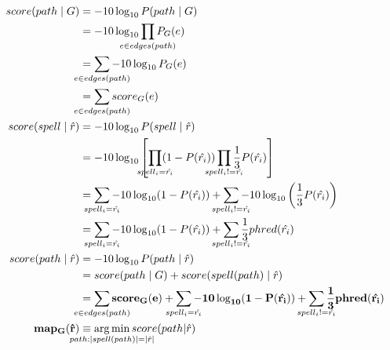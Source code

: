 \begin{align*}
    score(path \mid G) &= - 10 \log_{10} P(path \mid G) \\
		&= - 10 \log_{10} \smashoperator{\prod_{e \in edges(path)}} P_G(e) \\
		&= \smashoperator{\sum_{e \in edges(path)}} - 10 \log_{10} P_G(e) \\
		&= \smashoperator{\sum_{e \in edges(path)}} score_G(e) \\
	score(spell \mid \hat{r}) &= - 10 \log_{10} P(spell \mid \hat{r}) \\
		&= - 10 \log_{10} \left[ \smashoperator{\prod_{spell_i = \hat{r_i}}} (1-P(\hat{r_i})) \smashoperator{\prod_{\substack{spell_i != \hat{r_i}}}} \frac{1}{3} P(\hat{r_i}) \right] \\
		&= \smashoperator{\sum_{spell_i=\hat{r_i}}} - 10 \log_{10} (1-P(\hat{r_i})) + \smashoperator{\sum_{\substack{spell_i!=\hat{r_i}}}} - 10 \log_{10} \left( \frac{1}{3} P(\hat{r_i}) \right) \\
		&= \smashoperator{\sum_{spell_i=\hat{r_i}}} - 10 \log_{10} (1-P(\hat{r_i})) + \smashoperator{\sum_{\substack{spell_i!=\hat{r_i}}}} \frac{1}{3} phred(\hat{r_i}) \\
	score(path \mid \hat{r}) &= - 10 \log_{10} P(path \mid \hat{r}) \\
		&= score(path \mid G) + score(spell(path) \mid \hat{r}) \\
		&= \bf{\smashoperator{\sum_{e \in edges(path)}} score_G(e)
			+ \smashoperator{\sum_{spell_i=\hat{r_i}}} - 10 \log_{10} (1-P(\hat{r_i}))
			+ \smashoperator{\sum_{\substack{spell_i!=\hat{r_i}}}} \frac{1}{3} phred(\hat{r_i}) } \\
	\bf{map_G(\hat{r})} &\equiv \smashoperator{\argmin_{path: \lvert spell(path) \rvert = \lvert \hat{r} \rvert}} score(path | \hat{r}) \\
\end{align*}


